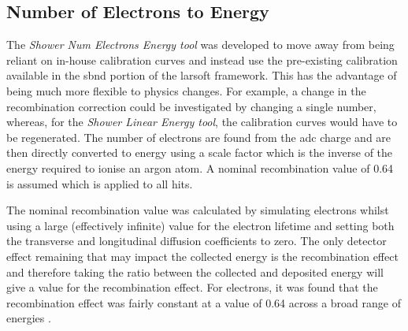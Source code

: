 \newpage

\subsection{Number of Electrons to Energy}\label{subchap:kGeVToElectrons}
The \textit{Shower Num Electrons Energy tool} was developed to move away from being reliant on in-house calibration curves and instead use the pre-existing calibration available in the \Gls{sbnd} portion of the \Gls{larsoft} framework. This has the advantage of being much more flexible to physics changes. For example, a change in the recombination correction could be investigated by changing a single number, whereas, for the \textit{Shower Linear Energy tool}, the calibration curves would have to be regenerated. The number of electrons are found from the \gls{adc} charge and are then directly converted to energy using a scale factor which is the inverse of the energy required to ionise an argon atom. A nominal recombination value of 0.64 is assumed which is applied to all hits.

The nominal recombination value was calculated by simulating electrons whilst using a large (effectively infinite) value for the electron lifetime and setting both the transverse and longitudinal diffusion coefficients to zero. The only detector effect remaining that may impact the collected energy is the recombination effect and therefore taking the ratio between the collected and deposited energy will give a value for the recombination effect. For electrons, it was found that the recombination effect was fairly constant at a value of 0.64 across a broad range of energies \cite{recombination_0.64}. 


